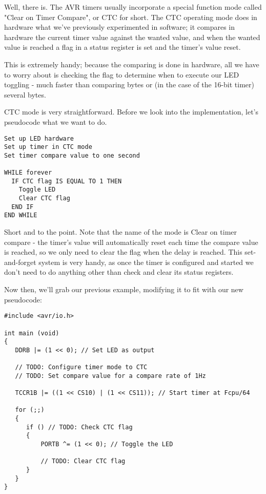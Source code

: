 \documentclass[a4paper,oneside]{book}
\begin{document}
Well, there is. The AVR timers usually incorporate a special function mode called "Clear on Timer Compare", or CTC for short. The CTC operating mode does in hardware what we've previously experimented in software; it compares in hardware the current timer value against the wanted value, and when the wanted value is reached a flag in a status register is set and the timer's value reset.

This is extremely handy; because the comparing is done in hardware, all we have to worry about is checking the flag to determine when to execute our LED toggling - much faster than comparing bytes or (in the case of the 16-bit timer) several bytes.

CTC mode is very straightforward. Before we look into the implementation, let's pseudocode what we want to do. 

\begin{center}
\begin{lstlisting}[keywordstyle=\color{black},commentstyle=\color{black}]
Set up LED hardware
Set up timer in CTC mode
Set timer compare value to one second

WHILE forever
  IF CTC flag IS EQUAL TO 1 THEN
    Toggle LED
    Clear CTC flag
  END IF
END WHILE 
\end{lstlisting}
\end{center}

Short and to the point. Note that the name of the mode is Clear on timer compare - the timer's value will automatically reset each time the compare value is reached, so we only need to clear the flag when the delay is reached. This set-and-forget system is very handy, as once the timer is configured and started we don't need to do anything other than check and clear its status registers.

Now then, we'll grab our previous example, modifying it to fit with our new pseudocode: 

\begin{center}
\begin{lstlisting}
#include <avr/io.h>

int main (void)
{
   DDRB |= (1 << 0); // Set LED as output

   // TODO: Configure timer mode to CTC
   // TODO: Set compare value for a compare rate of 1Hz

   TCCR1B |= ((1 << CS10) | (1 << CS11)); // Start timer at Fcpu/64

   for (;;)
   {
      if () // TODO: Check CTC flag
      {
          PORTB ^= (1 << 0); // Toggle the LED

          // TODO: Clear CTC flag
      }
   }
}
\end{lstlisting}
\end{center}
\end{document}
